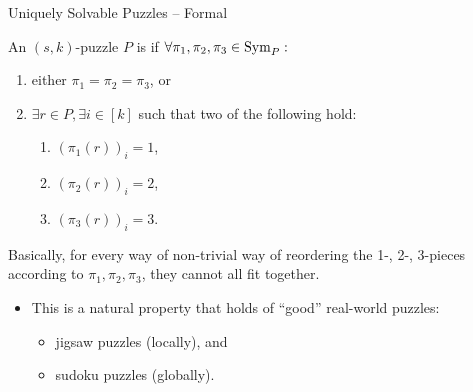 \documentclass[t,10pt,
mathserif,xcolor=dvipsnames]{beamer}
\begin{document}
\begin{myframe}{Uniquely Solvable Puzzles -- Formal}
  
  \begin{definition}
    An $(s,k)$-puzzle $P$ is \emph{} if
    $\forall \pi_1, \pi_2, \pi_3 \in \mathrm{Sym}_{P}:$
    \begin{enumerate}
    \item either $\pi_1 = \pi_2 = \pi_3$, or
    \item $\exists r \in P, \exists i \in [k]$ such that  two
      of the following hold:
      \begin{enumerate}
      \item $(\pi_1(r))_i = 1$,
      \item $(\pi_2(r))_i = 2$,
      \item $(\pi_3(r))_i = 3$.
      \end{enumerate}
    \end{enumerate}
    
  \end{definition}

  Basically, for every way of non-trivial way of reordering the 1-,
  2-, 3-pieces according to $\pi_1, \pi_2, \pi_3$, they cannot all fit
  together.

  \pause
  
  \begin{itemize}
  \item This is a natural property that holds of ``good'' real-world puzzles:
    \begin{itemize}
    \item jigsaw puzzles (locally), and
    \item sudoku puzzles (globally).
    \end{itemize}
  \end{itemize}
  
  
\end{myframe}
\end{document}
